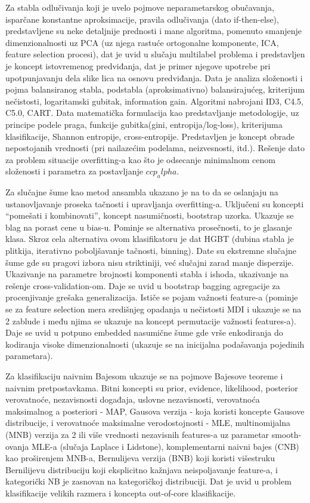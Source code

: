 \documentclass[fontsize=12bp, paper=a4]{scrarticle}
\begin{document}
Za stabla odlučivanja koji je uvelo pojmove neparametarskog obučavanja, isparčane konstantne aproksimacije, pravila odlučivanja (dato if-then-else), predstavljene su neke detaljnije prednosti i mane algoritma, pomenuto smanjenje dimenzionalnosti uz PCA (uz njega rastuće ortogonalne komponente, ICA, feature selection procesi), dat je uvid u slučaju multilabel problema i predstavljen je koncept istovremenog predviđanja, dat je primer njegove upotrebe pri upotpunjavanju dela slike lica na osnovu predviđanja. Data je analiza složenosti i pojma balansiranog stabla, podstabla (aproksimativno) balansirajućeg, kriterijum nečistosti, logaritamski gubitak, information gain. Algoritmi nabrojani ID3, C4.5, C5.0, CART. Data matematička formulacija kao predstavljanje metodologije, uz principe podele praga, funkcije gubitka(gini, entropija/log-loss), kriterijuma klasifikacije, Shannon entropije, cross-entropije. Predstavljen je koncept obrade nepostojanih vrednosti (pri nailazećim podelama, neizvesnosti, itd.). Rešenje dato za problem situacije overfitting-a kao što je odsecanje minimalnom cenom složenosti i parametra za postavljanje $ccp_alpha$.

\vbox{}


Za slučajne šume kao metod ansambla ukazano je na to da se oslanjaju na ustanovljavanje proseka tačnosti i upravljanja overfitting-a. Uključeni su koncepti ``pomešati i kombinovati'', koncept nasumičnosti, bootstrap uzorka. Ukazuje se blag na porast   cene u bias-u. Pominje se alternativa prosečnosti, to je glasanje klasa. Skroz cela alternativa ovom klasifikatoru je dat HGBT (dubina stabla je plitkija, iterativno poboljšavanje tačnosti, binning). Date su ekstremne slučajne šume gde su pragovi izbora nisu striktiniji, već slučajni zarad manje disperzije. Ukazivanje na parametre brojnosti komponenti stabla i ishoda, ukazivanje na rešenje cross-validation-om. Daje se uvid u bootstrap bagging agregacije za procenjivanje grešaka generalizacija. Ističe se pojam važnosti feature-a (pominje se za feature selection mera središnjeg opadanja u nečistosti MDI i ukazuje se na 2 zablude i među njima se ukazuje na koncept permutacije važnosti features-a). Daje se uvid u potpuno embedded nasumične šume gde vrše enkodiranja do kodiranja visoke dimenzionalnosti (ukazuje se na inicijalna podašavanja pojedinih parametara).

\vbox{}


Za klasifikaciju naivnim Bajesom ukazuje se na pojmove Bajesove teoreme i naivnim pretpostavkama. Bitni koncepti su prior, evidence, likelihood, posterior verovatnoće, nezavisnosti događaja, uslovne nezavisnosti, verovatnoća maksimalnog a posteriori - MAP, Gausova verzija - koja koristi koncepte Gausove distribucije, i verovatnoće maksimalne verodostojnosti - MLE, multinomijalna (MNB) verzija za 2 ili više vrednosti nezavisnih features-a uz parametar smooth-ovanja MLE-a (slučaja Laplace i Lidstone), komplementarni naivni bajes (CNB) kao proširenjem MNB-a, Bernulijeva verzija (BNB) koji koristi višestruku Bernilijevu distribuciju koji eksplicitno kažnjava neispoljavanje feature-a, i kategorički NB je zasnovan na kategoričkoj distribuciji. Dat je uvid u problem klasifikacije velikih razmera i koncepta out-of-core klasifikacije.
\end{document}
